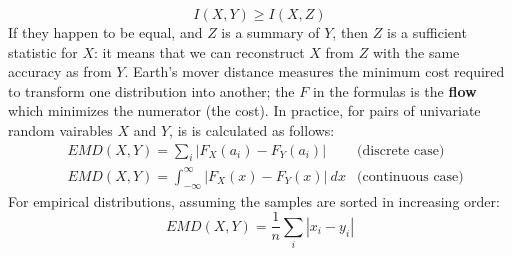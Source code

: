 \begin{equation*}
    I(X,Y) \geq I(X,Z)
\end{equation*}
If they happen to be equal, and $Z$ is a summary of $Y$, then $Z$ is a sufficient statistic for $X$: it means that we can reconstruct $X$ from $Z$ with the same accuracy as from $Y$.
Earth's mover distance measures the minimum cost required to transform one distribution into another; the $F$ in the formulas is the \textbf{flow} which minimizes the numerator (the cost). In practice, for pairs of univariate random vairables $X$ and $Y$, is is calculated as follows:
\begin{align*}
    &EMD(X,Y) = \sum_i |F_X(a_i) - F_Y(a_i)| &\text{(discrete case)}\\
    &EMD(X,Y) = \int_{-\infty}^{\infty} |F_X(x) - F_Y(x)| \ dx &\text{(continuous case)}
\end{align*}
For empirical distributions, assuming the samples are sorted in increasing order:
\begin{equation*}
    EMD(X,Y) = \frac{1}{n} \sum_i |x_i - y_i|
\end{equation*}